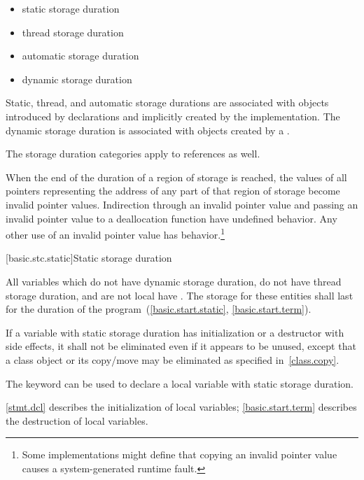 \begin{itemize}
\item static storage duration
\item thread storage duration
\item automatic storage duration
\item dynamic storage duration
\end{itemize}

\pnum
{}%
%
%
%
Static, thread, and automatic storage durations are associated with objects
introduced by declarations and implicitly created by
the implementation. The dynamic storage duration
is associated with objects created by a
.

\pnum
The storage duration categories apply to references as well.

\pnum
When the end of the duration of a region of storage is reached,
the values of all pointers
representing the address of any part of that region of storage
become invalid pointer values.
Indirection through an invalid pointer value and
passing an invalid pointer value to a deallocation function
have undefined behavior.
Any other use of an invalid pointer value has
behavior.\footnote{Some implementations might define that
copying an invalid pointer value
causes a system-generated runtime fault.}

[basic.stc.static]{Static storage duration}

\pnum
{}%
All variables which do not have dynamic storage duration, do not have thread
storage duration, and are not local
have . The
storage for these entities shall last for the duration of the
program~(\ref{basic.start.static}, \ref{basic.start.term}).

\pnum
If a variable with static storage duration has initialization or a
destructor with side effects, it shall not be eliminated even if it
appears to be unused, except that a class object or its copy/move may be
eliminated as specified in~\ref{class.copy}.

\pnum
{}%
The keyword  can be used to declare a local variable with
static storage duration. \begin{note} \ref{stmt.dcl} describes the
initialization of local  variables; \ref{basic.start.term}
describes the destruction of local  variables. \end{note}

